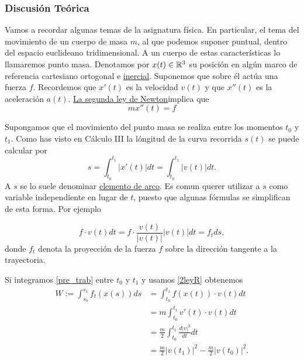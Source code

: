 \subsubsection{Discusión Teórica}
Vamos a recordar algunas temas de la asignatura física. En particular, el tema del movimiento de un cuerpo de masa $m$, al que podemos suponer puntual, dentro del espacio euclideano tridimensional. A un cuerpo de estas características lo llamaremos punto masa. Denotamos por $x(t)\in \rr^3$ su posición en algún marco de referencia cartesiano ortogonal e \href{https://es.wikipedia.org/wiki/Sistema_de_referencia_inercial}{inercial}\link. Suponemos
que sobre él actúa una fuerza $f$. Recordemos que $x'(t)$ es la velocidad $v(t)$ y que $x''(t)$ es la aceleración $a(t)$.  
\href{http://es.wikipedia.org/wiki/Leyes_de_Newton\#Segunda_ley_de_Newton_o_ley_de_fuerza}{La segunda ley de Newton}\link implica que
\begin{equation}\label{2leyR}\boxed{mx''(t)=f}\end{equation}


Supongamos que el movimiento del punto masa se realiza entre los momentos $t_0$ y $t_1$. Como has visto en Cálculo III la lóngitud de la curva recorrida 
$s(t)$ se puede calcular por
\begin{equation}\label{2ley}s=\int_{t_0}^{t_1}|x'(t)|dt=\int_{t_0}^{t_1}|v(t)|dt.\end{equation}
A $s$ se lo suele denominar \href{http://es.wikipedia.org/wiki/Longitud_de_arco}{elemento de arco}\link. Es comun querer utilizar a $s$ como variable independiente en
lugar de $t$, puesto que algunas fórmulas se simplifican de esta forma. Por ejemplo

\begin{equation}\label{pre_trab} f\cdot v(t)dt=f\cdot\frac{v(t)}{|v(t)|}|v(t)|dt=f_tds,\end{equation}
donde $f_t$ denota la proyección de la fuerza $f$ sobre la dirección tangente a la trayectoria.





Si integramos \eqref{pre_trab} entre $t_0$ y $t_1$ y usamos \eqref{2leyR} obtenemos
\[\begin{split} W:=\int_{s_0}^{s_1}f_t(x(s))ds&=\int_{t_0}^{t_1} f(x(t))\cdot v(t)dt\\
   & =m \int_{t_0}^{t_1} v'(t)\cdot v(t)dt\\
   &=\frac{m}{2} \int_{t_0}^{t_1} \frac{d|v|^2}{dt}dt\\
   &=\frac{m}{2}|v(t_1)|^2-\frac{m}{2}|v(t_0)|^2.  \end{split}\]


